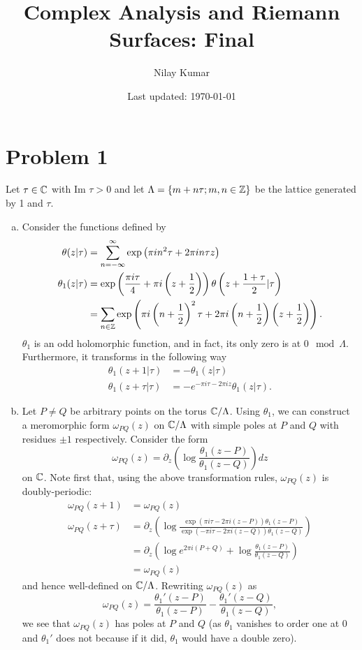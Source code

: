 \documentclass{../mathnotes}
\title{Complex Analysis and Riemann Surfaces: Final}
\author{Nilay Kumar}
\date{Last updated: \today}
\begin{document}
\maketitle

\section*{Problem 1}

Let $\tau\in\mathbb{C}$ with $\text{Im }\tau>0$ and let $\Lambda=\left\{ m+n\tau; m,n\in\mathbb{Z} \right\}$ be the lattice generated by 1 and $\tau$.
\begin{enumerate}[(a)]
    \item Consider the functions defined by 
        \begin{align*}
            \theta(z|\tau)&=\sum_{n=-\infty}^\infty \exp\left( \pi i n^2\tau + 2\pi in\tau z \right)\\
            \theta_1(z|\tau)&=\exp\left( \frac{\pi i \tau}{4}+\pi i\left(z+\frac{1}{2}\right) \right)\theta\left(z+\frac{1+\tau}{2}|\tau\right)\\
            &=\sum_{n\in\mathbb{Z}}\exp\left( \pi i\left( n+\frac{1}{2} \right)^2\tau+2\pi i\left( n+\frac{1}{2} \right)\left( z+\frac{1}{2} \right) \right).
        \end{align*}
        $\theta_1$ is an odd holomorphic function, and in fact, its only zero is at $0\mod\Lambda$. Furthermore, it transforms in the following way 
        \begin{align*}
            \theta_1(z+1|\tau) &=-\theta_1(z|\tau)\\
            \theta_1(z+\tau|\tau)&=-e^{-\pi i\tau-2\pi i z}\theta_1(z|\tau).
        \end{align*}

    \item Let $P\neq Q$ be arbitrary points on the torus $\mathbb{C}/\Lambda$. Using $\theta_1$, we can construct a meromorphic form $\omega_{PQ}(z)$ on $\mathbb{C}/\Lambda$
        with simple poles at $P$ and $Q$ with residues $\pm 1$ respectively. Consider the form
        \[\omega_{PQ}(z)=\partial_z\left( \log \frac{\theta_1(z-P)}{\theta_1(z-Q)} \right)dz\]
        on $\mathbb{C}$.  Note first that, using the above transformation rules, $\omega_{PQ}(z)$ is doubly-periodic:
        \begin{align*}
            \omega_{PQ}(z+1)&=\omega_{PQ}(z)\\
            \omega_{PQ}(z+\tau)&=\partial_z\left( \log \frac{\exp\left( \pi i\tau -2\pi i(z-P) \right)\theta_1(z-P)}{\exp\left( -\pi i\tau -2\pi i(z-Q) \right)\theta_1(z-Q)} \right)\\
            &=\partial_z\left( \log e^{2\pi i(P+Q)}+\log \frac{\theta_1(z-P)}{\theta_1(z-Q)} \right)\\
            &=\omega_{PQ}(z)
        \end{align*}
        and hence well-defined on $\mathbb{C}/\Lambda$. Rewriting $\omega_{PQ}(z)$ as
        \[\omega_{PQ}(z)=\frac{\theta_1'(z-P)}{\theta_1(z-P)}-\frac{\theta_1'(z-Q)}{\theta_1(z-Q)},\]
        we see that $\omega_{PQ}(z)$ has poles at $P$ and $Q$ (as $\theta_1$ vanishes to order one at 0 and $\theta_1'$ does not because if it did, $\theta_1$ would have a double zero).
        

\end{enumerate}
\end{document}
